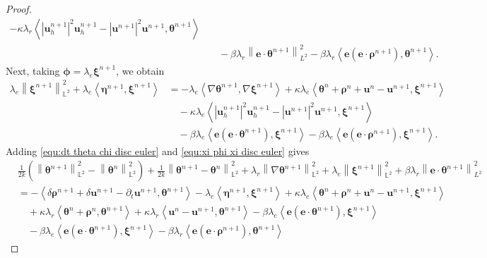 \documentclass[11pt, reqno]{amsart}
\theoremstyle{definition}
\theoremstyle{remark}
\numberwithin{equation}{section}
\newcommand{\bff}{\boldsymbol}
\newcommand{\bb}{\mathbb}
\newcommand{\norm}[2]{\left\|{#1}\right\|_{#2}}
\newcommand{\inpro}[2]{\left\langle#1,#2\right\rangle}
\newcommand{\abs}[1]{\left|{#1}\right|}
\begin{document}
\begin{proof}
\begin{align}
		-
		\kappa \lambda_r \inpro{\abs{\bff{u}_h^{n+1}}^2 \bff{u}_h^{n+1} - \abs{\bff{u}^{n+1}}^2 \bff{u}^{n+1}}{\bff{\theta}^{n+1}}
		\nonumber \\
		&\quad 
		-
		\beta \lambda_r \norm{\bff{e}\cdot \bff{\theta}^{n+1}}{L^2}^2
		-
		\beta \lambda_r \inpro{\bff{e}(\bff{e}\cdot \bff{\rho}^{n+1})}{\bff{\theta}^{n+1}}.
	\end{align}
	Next, taking $\bff{\phi}= \lambda_e \bff{\xi}^{n+1}$, we obtain
	\begin{align}\label{equ:xi phi xi disc euler}
		\nonumber
		\lambda_e \norm{\bff{\xi}^{n+1}}{\bb{L}^2}^2
		+
		\lambda_e \inpro{\bff{\eta}^{n+1}}{\bff{\xi}^{n+1}}
		&=
		-
		\lambda_e \inpro{\nabla \bff{\theta}^{n+1}}{\nabla \bff{\xi}^{n+1}}
		+
		\kappa \lambda_e \inpro{\bff{\theta}^n+\bff{\rho}^n+\bff{u}^n-\bff{u}^{n+1}}{\bff{\xi}^{n+1}}
		\nonumber \\
		&\quad 
		-
		\kappa \lambda_e \inpro{\abs{\bff{u}_h^{n+1}}^2 \bff{u}_h^{n+1} - \abs{\bff{u}^{n+1}}^2 \bff{u}^{n+1}}{\bff{\xi}^{n+1}}
		\nonumber \\
		&\quad
		-
		\beta\lambda_e \inpro{\bff{e}(\bff{e}\cdot \bff{\theta}^{n+1})}{\bff{\xi}^{n+1}}
		-
		\beta \lambda_e \inpro{\bff{e}(\bff{e}\cdot \bff{\rho}^{n+1})}{\bff{\xi}^{n+1}}.
 	\end{align}
	Adding \eqref{equ:dt theta chi disc euler} and \eqref{equ:xi phi xi disc euler} gives
	\begin{align*}
		&\frac{1}{2k} \left( \norm{\bff{\theta}^{n+1}}{\bb{L}^2}^2 - \norm{\bff{\theta}^n}{\bb{L}^2}^2 \right)
		+
		\frac{1}{2k} \norm{\bff{\theta}^{n+1}-\bff{\theta}^n}{\bb{L}^2}^2
		+
		\lambda_r \norm{\nabla \bff{\theta}^{n+1}}{\bb{L}^2}^2
		+
		\lambda_e \norm{\bff{\xi}^{n+1}}{\bb{L}^2}^2
		+
		\beta \lambda_r \norm{\bff{e}\cdot \bff{\theta}^{n+1}}{L^2}^2
		\\
		&=
		-\inpro{\delta \bff{\rho}^{n+1} + \delta \bff{u}^{n+1} -\partial_t \bff{u}^{n+1}}{\bff{\theta}^{n+1}}
		-
		\lambda_e \inpro{\bff{\eta}^{n+1}}{\bff{\xi}^{n+1}}
		+
		\kappa \lambda_e \inpro{\bff{\theta}^n+\bff{\rho}^n+\bff{u}^n-\bff{u}^{n+1}}{\bff{\xi}^{n+1}}
		\\
		&\quad
		+
		\kappa \lambda_r \inpro{\bff{\theta}^n+\bff{\rho}^n}{\bff{\theta}^{n+1}}
		+
		\kappa\lambda_r \inpro{\bff{u}^n-\bff{u}^{n+1}}{\bff{\theta}^{n+1}}
		-
		\beta\lambda_e \inpro{\bff{e}(\bff{e}\cdot \bff{\theta}^{n+1})}{\bff{\xi}^{n+1}}
		\\
		&\quad
		-
		\beta\lambda_e \inpro{\bff{e}(\bff{e}\cdot \bff{\theta}^{n+1})}{\bff{\xi}^{n+1}}
		-
		\beta \lambda_r \inpro{\bff{e}(\bff{e}\cdot \bff{\rho}^{n+1})}{\bff{\theta}^{n+1}}

\end{align*}
\end{proof}
\end{document}
